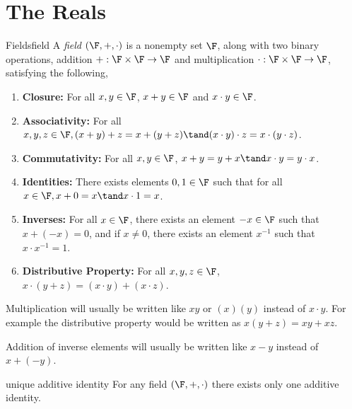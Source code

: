 \documentclass{report}
\begin{document}
\chapter{The Reals}

\begin{definition}{Fields}{field}
  A \emph{field} $\left(\F, +, \cdot\right)$ is a nonempty set $\F$, along with two binary operations,
  addition $+: \F \times \F \rightarrow \F$
  and multiplication $\cdot: \F \times \F \rightarrow \F$, satisfying the following,

  \begin{enumerate}[label=(\roman*)]
    \item \textbf{Closure:} For all $x, y \in \F$, $x + y \in \F$ and $x \cdot y \in \F$.
    \item \textbf{Associativity:} For all $x, y, z \in \F, (x + y) + z = x + (y + z) \tand (x \cdot y) \cdot z = x \cdot (y \cdot z)$.
    \item \textbf{Commutativity:} For all $x, y \in \F$, $x + y = y + x \tand x \cdot y = y \cdot x$.
    \item \textbf{Identities:} There exists elements $0, 1 \in \F$ such that for all $x \in \F, x + 0 = x \tand x \cdot 1 = x$.
    \item \textbf{Inverses:} For all $x \in \F$, there exists an element $-x \in \F$ such that $x + (-x) = 0$, and if $x \neq 0$, there exists an element $x^{-1}$ such that $x \cdot x^{-1} = 1$.
    \item \textbf{Distributive Property:} For all $x, y, z \in \F$, $x \cdot (y + z) = (x \cdot y) + (x \cdot z)$.
  \end{enumerate}
\end{definition}

\begin{notation}{}{}
  Multiplication will usually be written like $xy$ or $(x)(y)$ instead of $x \cdot y$.
  For example the distributive property would be written as $x(y + z) = xy + xz$.
\end{notation}

\begin{notation}{}{}
  Addition of inverse elements will usually be written like $x - y$ instead of $x + (-y)$.
\end{notation}

\begin{lemma}{unique additive identity}{}
  For any field $\left(\F, +, \cdot\right)$ there exists only one additive identity.
\end{lemma}
\end{document}
